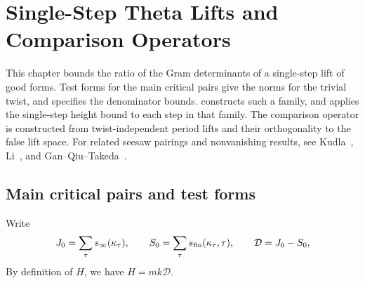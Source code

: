 \chapter{Single-Step Theta Lifts and Comparison Operators}
\label{chap:onelift}

\begin{chapterguide}
This chapter bounds the ratio of the Gram determinants of a single-step lift of good forms. Test forms for the main critical pairs give the norms for the trivial twist, and  specifies the denominator bounds.  constructs such a family, and  applies the single-step height bound to each step in that family. The comparison operator is constructed from twist-independent period lifts and their orthogonality to the false lift space. For related seesaw pairings and nonvanishing results, see Kudla~\cite{Kudla1984}, Li~\cite{Li1992}, and Gan--Qiu--Takeda~\cite{GQT2014}.
\end{chapterguide}

\section{Main critical pairs and test forms}
\label{sec:c-main-pairs}

Write
\[
 J_0=\sum_{\tau}s_\infty(\kappa_\tau),\qquad
 S_0=\sum_{\tau}s_{\rm fin}(\kappa_\tau,\tau),\qquad
 \mathcal D=J_0-S_0 ,
\]
By definition of $H$, we have $H=mk\mathcal D$.

